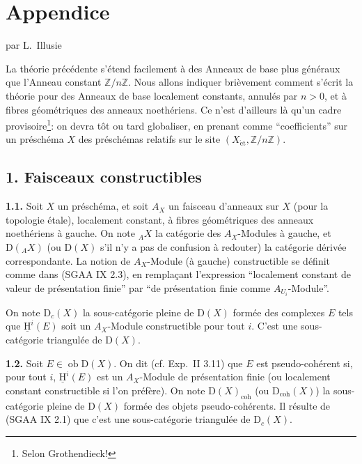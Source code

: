 \documentclass[11pt]{article}
\providecommand{\uH}{\underline{\mathrm H}}
\newcommand{\D}{\mathrm{D}}
\newcommand{\Z}{\mathbb{Z}}
\newcommand{\ob}{\operatorname{ob}}
\providecommand{\ob}{\operatorname{ob}}
\providecommand{\Z}{\mathbb Z}
\begin{document}
\section*{Appendice}
\begin{center}
par L.~Illusie
\end{center}

La théorie précédente s'étend facilement à des Anneaux de base plus généraux que l'Anneau constant $\Z/n\Z$. Nous allons indiquer brièvement comment s'écrit la théorie pour des Anneaux de base localement constants, annulés par $n>0$, et à fibres géométriques des anneaux noethériens. Ce n'est d'ailleurs là qu'un cadre provisoire\footnote{Selon Grothendieck!}: on devra tôt ou tard globaliser, en prenant comme ``coefficients'' sur un préschéma $X$ des préschémas relatifs sur le site $(X_{\mathrm{\acute et}},\Z/n\Z)$.

\subsection*{1. Faisceaux constructibles}

\textbf{1.1.} Soit $X$ un préschéma, et soit $A_X$ un faisceau d'anneaux sur $X$ (pour la topologie étale), localement constant, à fibres géométriques des anneaux noethériens à gauche. On note ${}_A X$ la catégorie des $A_X$-Modules à gauche, et $\D({}_A X)$ (ou $\D(X)$ s'il n'y a pas de confusion à redouter) la catégorie dérivée correspondante. La notion de $A_X$-Module (à gauche) constructible se définit comme dans (SGAA IX 2.3), en remplaçant l'expression ``localement constant de valeur de présentation finie'' par ``de présentation finie comme $A_{U_i}$-Module''.

On note $\D_c(X)$ la sous-catégorie pleine de $\D(X)$ formée des complexes $E$ tels que $\uH^i(E)$ soit un $A_X$-Module constructible pour tout $i$. C'est une sous-catégorie triangulée de $\D(X)$.

\textbf{1.2.} Soit $E\in\ob\D(X)$. On dit (cf. Exp.~II 3.11) que $E$ est pseudo-cohérent si, pour tout $i$, $\uH^i(E)$ est un $A_X$-Module de présentation finie (ou localement constant constructible si l'on préfère). On note $\D(X)_{\mathrm{coh}}$ (ou $\D_{\mathrm{coh}}(X)$) la sous-catégorie pleine de $\D(X)$ formée des objets pseudo-cohérents. Il résulte de (SGAA IX 2.1) que c'est une sous-catégorie triangulée de $\D_c(X)$.
\end{document}

